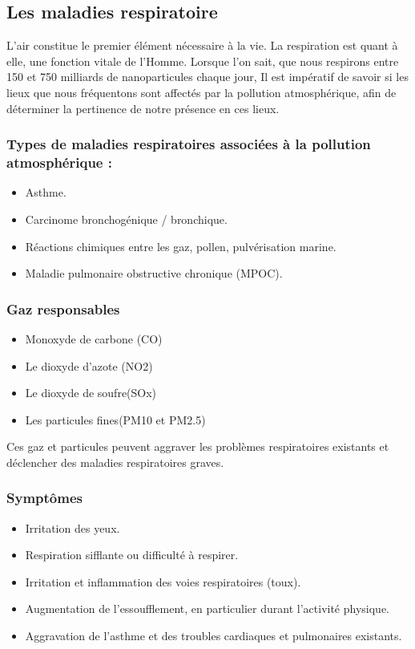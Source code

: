 \documentclass{report}
\begin{document}
\subsection{Les maladies respiratoire}
L’air constitue le premier élément nécessaire à la vie. La respiration est quant à elle, une fonction vitale de l’Homme. Lorsque l’on sait, que nous respirons entre 150 et 750 milliards de nanoparticules chaque jour, Il est impératif de savoir si les lieux que nous fréquentons sont affectés par la pollution atmosphérique, afin de déterminer la pertinence de notre présence en ces lieux.

\subsubsection{Types de maladies respiratoires associées à la pollution atmosphérique :}
\begin{itemize}
        \item Asthme.
        \item Carcinome bronchogénique / bronchique.
        \item Réactions chimiques entre les gaz, pollen, pulvérisation marine.
        \item Maladie pulmonaire obstructive chronique (MPOC). 
    \end{itemize}
\subsubsection{Gaz responsables}
\begin{itemize}
        \item Monoxyde de carbone (CO) 
        \item Le dioxyde d'azote (NO2)
        \item Le dioxyde de soufre(SOx) 
        \item Les particules fines(PM10 et PM2.5)
    \end{itemize}
    
Ces gaz et particules peuvent aggraver les problèmes respiratoires existants et déclencher des maladies respiratoires graves.

\subsubsection{Symptômes}
  \begin{itemize}  
\item Irritation des yeux.
\item Respiration sifflante ou difficulté à respirer.
\item Irritation et inflammation des voies respiratoires (toux).
\item Augmentation de l’essoufflement, en particulier durant l’activité physique.
\item Aggravation de l'asthme et des troubles cardiaques et pulmonaires existants.
\end{itemize}
\end{document}
